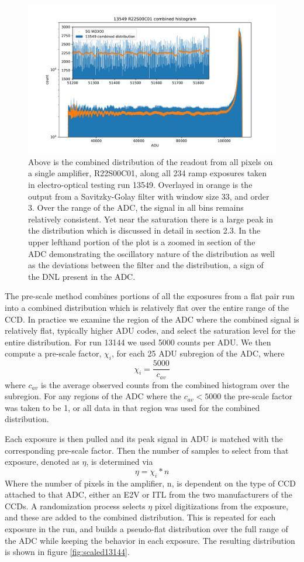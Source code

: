 \documentclass[11pt, letterpaper]{article}
\begin{document}
\begin{figure}
    \centering
    \includegraphics[width=0.5\linewidth]{bar13549.pdf}
    \caption{Above is the combined distribution of the readout from all pixels on a single amplifier, R22S00C01, along all 234 ramp exposures taken in electro-optical testing run 13549. Overlayed in orange is the output from a Savitzky-Golay filter with window size 33, and order 3. Over the range of the ADC, the signal in all bins remains relatively consistent. Yet near the saturation there is a large peak in the distribution which is discussed in detail in section 2.3. In the upper lefthand portion of the plot is a zoomed in section of the ADC demonstrating the oscillatory nature of the distribution as well as the deviations between the filter and the distribution, a sign of the DNL present in the ADC.}
    \label{fig:filter13549}
\end{figure}


The pre-scale method combines portions of all the exposures from a flat pair run into a combined distribution which is relatively flat over the entire range of the CCD. 
In practice we examine the region of the ADC where the combined signal is relatively flat, typically higher ADU codes, and select the saturation level for the entire distribution. 
For run 13144 we used 5000 counts per ADU. 
 We then compute a pre-scale factor, $\chi _i$, for each 25 ADU subregion of the ADC, where
\begin{equation}
\chi_i = \frac{5000}{c_{av}}
\label{eq: prescale}
\end{equation}
where $c_{av}$ is the average observed counts from the combined histogram over the subregion. 
For any regions of the ADC where the $c_{av} < 5000$ the pre-scale factor was taken to be 1, or all data in that region was used for the combined distribution. 
\indent 


Each exposure is then pulled and its peak signal in ADU is matched with the corresponding pre-scale factor. 
Then the number of samples to select from that exposure, denoted as $\eta $, is determined via
 \begin{equation}
 \eta = \chi_i *n 
 \label{eq:selectedsamples}
\end{equation}
Where the number of pixels in the amplifier, n, is dependent on the type of CCD attached to that ADC, either an E2V or ITL from the two manufacturers of the CCDs. 
A randomization process selects $\eta$ pixel digitizations from the exposure, and these are added to the combined distribution. 
This is repeated for each exposure in the run, and builds a pseudo-flat distribution over the full range of the ADC while keeping the behavior in each exposure. 
The resulting distribution is shown in figure \ref{fig:scaled13144}. 
\end{document}
